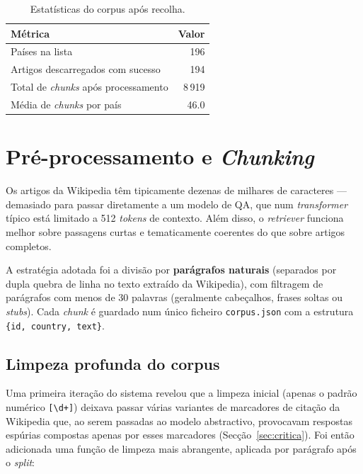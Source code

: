\documentclass[11pt,a4paper]{article}
\begin{document}
\begin{table}[h]
\centering
\begin{tabular}{lr}
\toprule
\textbf{Métrica} & \textbf{Valor} \\
\midrule
Países na lista & 196 \\
Artigos descarregados com sucesso & 194 \\
Total de \emph{chunks} após processamento & 8\,919 \\
Média de \emph{chunks} por país & 46.0 \\
\bottomrule
\end{tabular}
\caption{Estatísticas do corpus após recolha.}
\end{table}

\section{Pré-processamento e \emph{Chunking}}

Os artigos da Wikipedia têm tipicamente dezenas de milhares de caracteres --- demasiado para passar diretamente a um modelo de QA, que num \emph{transformer} típico está limitado a 512 \emph{tokens} de contexto. Além disso, o \emph{retriever} funciona melhor sobre passagens curtas e tematicamente coerentes do que sobre artigos completos.

A estratégia adotada foi a divisão por \textbf{parágrafos naturais} (separados por dupla quebra de linha no texto extraído da Wikipedia), com filtragem de parágrafos com menos de 30 palavras (geralmente cabeçalhos, frases soltas ou \emph{stubs}). Cada \emph{chunk} é guardado num único ficheiro \texttt{corpus.json} com a estrutura \texttt{\{id, country, text\}}.

\subsection{Limpeza profunda do corpus}

Uma primeira iteração do sistema revelou que a limpeza inicial (apenas o padrão numérico \texttt{[\textbackslash d+]}) deixava passar várias variantes de marcadores de citação da Wikipedia que, ao serem passadas ao modelo abstractivo, provocavam respostas espúrias compostas apenas por esses marcadores (Secção~\ref{sec:critica}). Foi então adicionada uma função de limpeza mais abrangente, aplicada por parágrafo após o \emph{split}:
\end{document}
